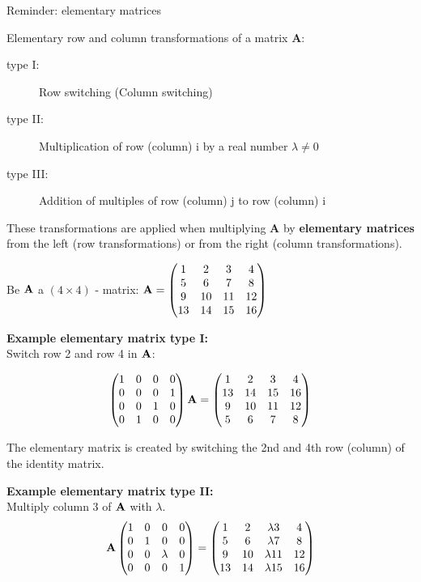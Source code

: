 \begin{vbframe}{Reminder: elementary matrices}

Elementary row and column transformations of a matrix $\bm{A}$:

\begin{description}
\item[type I:] Row switching (Column switching)
\item[type II:] Multiplication of row (column) i by a real number $\lambda \not= 0$
\item[type III:] Addition of multiples of row (column) j to row (column) i
\end{description}

These transformations are applied when multiplying $\bm{A}$ by \textbf{elementary matrices}
from the left (row transformations) or from the right (column transformations).

\framebreak

Be $\mathbf{A}$ a $(4 \times 4)$ - matrix:
$\mathbf{A} = \begin{pmatrix} 1 & 2 & 3 & 4 \\ 5 & 6 & 7 & 8 \\ 9 & 10 & 11 & 12 \\ 13 & 14 & 15 & 16 \end{pmatrix}$


\lz

\textbf{Example elementary matrix type I:}\\
Switch row 2 and row 4 in $\mathbf{A}$:

$$
\begin{pmatrix}  1 & 0 & 0 & 0 \\
      0 & 0 & 0 & 1 \\
      0 & 0 & 1 & 0 \\
      0 & 1 & 0 & 0  \end{pmatrix}
\mathbf{A}
= \begin{pmatrix} 1 & 2 & 3 & 4 \\ 13 & 14 & 15 & 16 \\ 9 & 10 & 11 & 12 \\ 5 & 6 & 7 & 8 \end{pmatrix}
$$
\vspace*{0.2cm}

The elementary matrix is created by switching the 2nd and 4th row (column) of the identity matrix.

\framebreak

\textbf{Example elementary matrix type II:}\\
Multiply column 3 of $\mathbf{A}$ with $\lambda$.
$$
\mathbf{A}
\begin{pmatrix}  1 & 0 & 0 & 0 \\
      0 & 1 & 0 & 0 \\
      0 & 0 & \lambda & 0 \\
      0 & 0 & 0 & 1  \end{pmatrix}
= \begin{pmatrix} 1 & 2 & \lambda 3 & 4 \\ 5 & 6 & \lambda 7 & 8 \\
       9 & 10 & \lambda 11 & 12 \\ 13 & 14 & \lambda 15 & 16 \end{pmatrix}
$$


\end{vbframe}
